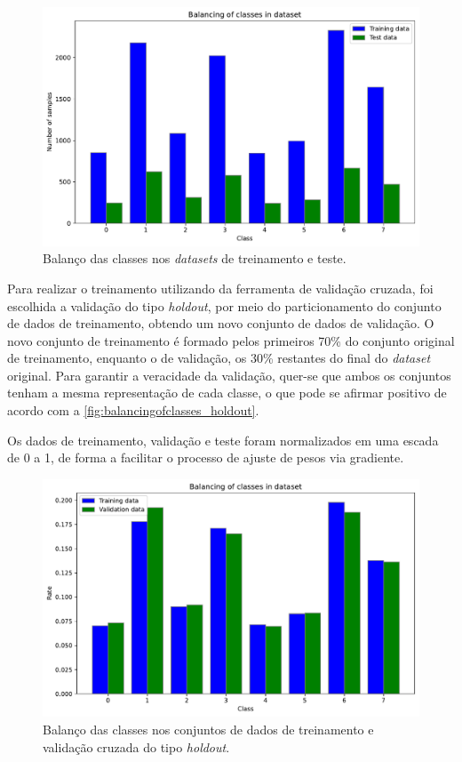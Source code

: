 \begin{figure}[H]
	\centering
	\includegraphics[width=0.75\linewidth]{../../plot/Balancing_of_classes}
	\caption{Balanço das classes nos \textit{datasets} de treinamento e teste.}
	\label{fig:balancingofclasses}
\end{figure}

Para realizar o treinamento utilizando da ferramenta de validação cruzada, foi escolhida a validação do tipo \textit{holdout}, por meio do particionamento do conjunto de dados de treinamento, obtendo um novo conjunto de dados de validação. O novo conjunto de treinamento é formado pelos primeiros 70\% do conjunto original de treinamento, enquanto o de validação, os 30\% restantes do final do \textit{dataset} original. Para garantir a veracidade da validação, quer-se que ambos os conjuntos tenham a mesma representação de cada classe, o que pode se afirmar positivo de acordo com a \autoref{fig:balancingofclasses_holdout}. 

Os dados de treinamento, validação e teste foram normalizados em uma escada de 0 a 1, de forma a facilitar o processo de ajuste de pesos via gradiente.

\begin{figure}[H]
\centering
\includegraphics[width=0.75\linewidth]{../../plot/Balancing_of_classes_holdout}
\caption{Balanço das classes nos conjuntos de dados de treinamento e validação cruzada do tipo \textit{holdout}.}
\label{fig:balancingofclasses_holdout}
\end{figure}




